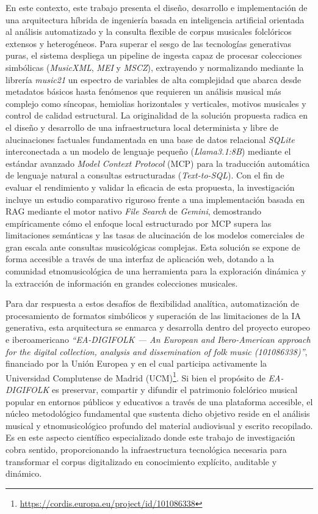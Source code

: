 En este contexto, este trabajo presenta el diseño, desarrollo e implementación de una arquitectura híbrida de ingeniería basada en inteligencia artificial orientada al análisis automatizado y la consulta flexible de corpus musicales folclóricos extensos y heterogéneos. Para superar el sesgo de las tecnologías generativas puras, el sistema despliega un pipeline de ingesta capaz de procesar colecciones simbólicas (\textit{MusicXML}, \textit{MEI} y \textit{MSCZ}), extrayendo y normalizando mediante la librería \textit{music21} un espectro de variables de alta complejidad que abarca desde metadatos básicos hasta fenómenos que requieren un análisis musical más complejo como síncopas, hemiolias horizontales y verticales, motivos musicales y control de calidad estructural. La originalidad de la solución propuesta radica en el diseño y desarrollo de una infraestructura local determinista y libre de alucinaciones factuales fundamentada en una base de datos relacional \textit{SQLite} interconectada a un modelo de lenguaje pequeño (\textit{Llama3.1:8B}) mediante el estándar avanzado \textit{Model Context Protocol} (MCP) \citep{anthropic2024mcp} para la traducción automática de lenguaje natural a consultas estructuradas (\textit{Text-to-SQL}). Con el fin de evaluar el rendimiento y validar la eficacia de esta propuesta, la investigación incluye un estudio comparativo riguroso frente a una implementación basada en RAG mediante el motor nativo \textit{File Search} de \textit{Gemini}, demostrando empíricamente cómo el enfoque local estructurado por MCP supera las limitaciones semánticas y las tasas de alucinación de los modelos comerciales de gran escala ante consultas musicológicas complejas. Esta solución se expone de forma accesible a través de una interfaz de aplicación web, dotando a la comunidad etnomusicológica de una herramienta para la exploración dinámica y la extracción de información en grandes colecciones musicales.

Para dar respuesta a estos desafíos de flexibilidad analítica, automatización de procesamiento de formatos simbólicos y superación de las limitaciones de la IA generativa, esta arquitectura se enmarca y desarrolla dentro del proyecto europeo e iberoamericano \textit{``EA-DIGIFOLK — An European and Ibero-American approach for the digital collection, analysis and dissemination of folk music (101086338)''}, financiado por la Unión Europea y en el cual participa activamente la Universidad Complutense de Madrid (UCM)\footnote{\url{https://cordis.europa.eu/project/id/101086338}}. Si bien el propósito de \textit{EA-DIGIFOLK} es preservar, compartir y difundir el patrimonio folclórico musical popular en entornos públicos y educativos a través de una plataforma accesible, el núcleo metodológico fundamental que sustenta dicho objetivo reside en el análisis musical y etnomusicológico profundo del material audiovisual y escrito recopilado. Es en este aspecto científico especializado donde este trabajo de investigación cobra sentido, proporcionando la infraestructura tecnológica necesaria para transformar el corpus digitalizado en conocimiento explícito, auditable y dinámico.

